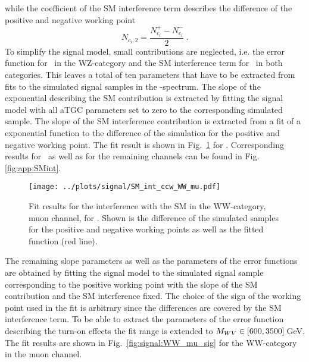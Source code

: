 while the coefficient of the SM interference term describes the difference of the positive and negative working point
\begin{equation}
N_{c_i,2} = \frac{N_{c_i}^{+}-N_{c_i}^{-}}{2} ~.
\label{eq:signal:n2}
\end{equation}
To simplify the signal model, small contributions are neglected, i.e. the error function for \Tcb \ in the WZ-category and the SM interference term for \Tcwww \ in both categories. This leaves a total of ten parameters that have to be extracted from fits to the simulated signal samples in the \MWV -spectrum. The slope of the exponential describing the SM contribution is extracted by fitting the signal model with all aTGC parameters set to zero to the corresponding simulated sample. The slope of the SM interference contribution is extracted from a fit of a exponential function to the difference of the simulation for the positive and negative working point. The fit result is shown in Fig.~\ref{fig:signal:sm_int_WW_mu} for \Tccw. Corresponding results for \Tcb \ as well as for the remaining channels can be found in Fig.\ref{fig:app:SMint}.\\
\begin{figure}
	\centering
		\texttt{[image: ../plots/signal/SM\_int\_ccw\_WW\_mu.pdf]}
	\caption[Fit results for the interference with the SM in the WW-category, muon channel]{Fit results for the interference with the SM in the WW-category, muon channel, for \Tccw . Shown is the difference of the simulated samples for the positive and negative working points as well as the fitted function (red line).}
	\label{fig:signal:sm_int_WW_mu}
\end{figure}

\noindent The remaining slope parameters as well as the parameters of the error functions are obtained by fitting the signal model to the simulated signal sample corresponding to the positive working point with the slope of the SM contribution and the SM interference fixed. The choice of the sign of the working point used in the fit is arbitrary since the differences are covered by the SM interference term. To be able to extract the parameters of the error function describing the turn-on effects the fit range is extended to $M_{WV} \in [600,3500]$\,GeV. The fit results are shown in Fig.~\ref{fig:signal:WW_mu_sig} for the WW-category in the muon channel.

